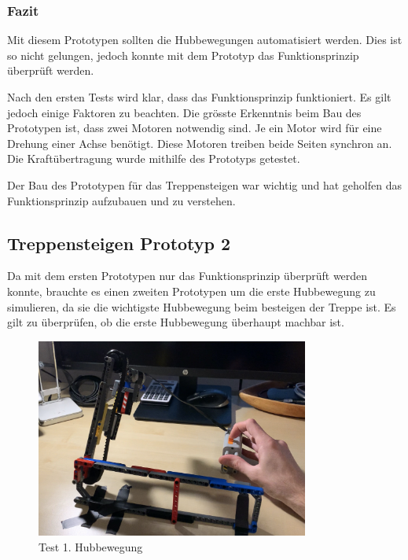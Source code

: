 \subsubsection{Fazit}

Mit diesem Prototypen sollten die Hubbewegungen automatisiert werden. Dies ist so nicht gelungen, jedoch konnte mit dem Prototyp das Funktionsprinzip überprüft werden.


Nach den ersten Tests wird klar, dass das Funktionsprinzip funktioniert. Es gilt jedoch einige Faktoren zu beachten. Die grösste Erkenntnis beim Bau des Prototypen ist, dass zwei Motoren notwendig sind. Je ein Motor wird für eine Drehung einer Achse benötigt. Diese Motoren treiben beide Seiten synchron an. Die Kraftübertragung wurde mithilfe des Prototyps getestet.

Der Bau des Prototypen für das Treppensteigen war wichtig und hat geholfen das Funktionsprinzip aufzubauen und zu verstehen.

\newpage

\subsection{Treppensteigen Prototyp 2}

Da mit dem ersten Prototypen nur das Funktionsprinzip überprüft werden konnte, brauchte es einen zweiten Prototypen um die erste Hubbewegung zu simulieren, da sie die wichtigste Hubbewegung beim besteigen der Treppe ist. Es gilt zu überprüfen, ob die erste Hubbewegung überhaupt machbar ist.

\begin{figure}[H]
  \includegraphics[width=0.8\textwidth]{img/Test 1. Hub.png}
  \centering
  \caption{Test 1. Hubbewegung}
\end{figure}

